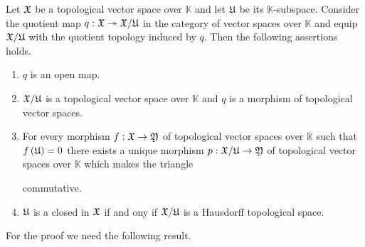 \begin{theorem}\label{theorem:quotients_of_topological_vector_spaces}
   Let ${\mathfrak X}$ be a topological vector space over $\mathbb{K}$ and let ${\mathfrak U}$ be its $\mathbb{K}$-subspace. Consider the quotient map $q:{\mathfrak X}\twoheadrightarrow {\mathfrak X}/{\mathfrak U}$ in the category of vector spaces over $\mathbb{K}$ and equip ${\mathfrak X}/{\mathfrak U}$ with the quotient topology induced by $q$. Then the following assertions holds.
   \begin{enumerate}[label=\emph{\textbf{(\arabic*)}}, leftmargin=*]
      \item $q$ is an open map.
      \item ${\mathfrak X}/{\mathfrak U}$ is a topological vector space over $\mathbb{K}$ and $q$ is a morphism of topological vector spaces.
      \item For every morphism $f:{\mathfrak X}\rightarrow {\mathfrak Y}$ of topological vector spaces over $\mathbb{K}$ such that $f\left({\mathfrak U}\right) = 0$ there exists a unique morphism $p:{\mathfrak X}/{\mathfrak U}\rightarrow {\mathfrak Y}$ of topological vector spaces over $\mathbb{K}$ which makes the triangle
            \begin{center}
            \end{center}
            commutative.
      \item ${\mathfrak U}$ is a closed in ${\mathfrak X}$ if and ony if ${\mathfrak X}/{\mathfrak U}$ is a Hausdorff topological space.
   \end{enumerate}
\end{theorem}
\noindent
For the proof we need the following result.

